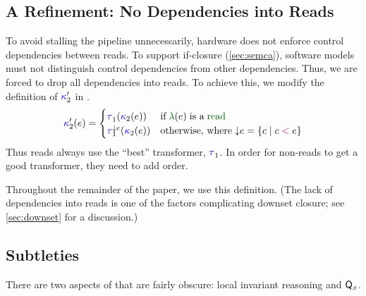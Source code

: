 \subsection{A Refinement: No Dependencies into Reads}
\label{sec:read-read}

To avoid stalling the \CPU{} pipeline unnecessarily, hardware does not
enforce control dependencies between reads.  To support if-closure
(\textsection\ref{sec:semca}), software models must not distinguish control
dependencies from other dependencies.  Thus, we are forced to drop all
dependencies into reads.  To achieve this, we modify the definition of
${\color{blue}\kappa}'_2$ in .
\begin{displaymath}
  \labelingForm'_2(\aEv)=
  \begin{cases}
    \aTr[1]{}{\labelingForm_2(\aEv)} & \text{if}\; \labeling(\aEv) \;\text{is a}\sread
    \\
    \aTr[1]{\Cdown{\aEv}}{\labelingForm_2(\aEv)} & \text{otherwise, where}\; \Cdown{\aEv}=\{ \cEv \mid \cEv \lt \aEv \}
  \end{cases}
\end{displaymath}
Thus reads always use the ``best'' transformer, $\aTr[1]{}{}$.  In order for
non-reads to get a good transformer, they need to add order.
  
Throughout the remainder of the paper, we use this definition.  (The lack of
dependencies into reads is one of the factors complicating downset closure;
see \textsection\ref{sec:downset} for a discussion.)

\subsection{Subtleties}
\label{sec:q}

There are two aspects of  that are fairly obscure: local
invariant reasoning and $\mathsf{Q}_{x}$.  

